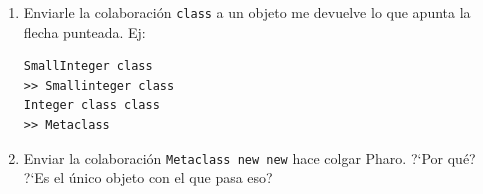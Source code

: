 \documentclass[a4paper, 11pt]{article}
\begin{document}
\begin{enumerate}
 \item Enviarle la colaboraci\'on \texttt{class} a un objeto me devuelve lo que apunta la flecha punteada. Ej: 
\begin{verbatim}
SmallInteger class
>> Smallinteger class
Integer class class
>> Metaclass
\end{verbatim}
  
 \item Enviar la colaboraci\'on \texttt{Metaclass new new} hace colgar Pharo. ?`Por qu\'e? ?`Es el \'unico objeto con el que pasa eso? 

\end{enumerate}
\end{document}

